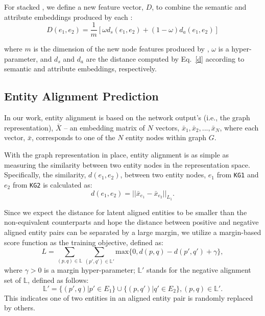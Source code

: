     For stacked \HRGCNs, we define a new feature vector, $D$, to combine the semantic and attribute embeddings produced by each \HRGCN:
	\begin{equation}
		D(e_1,e_2)=\frac{1}{m}[\omega d_s(e_1,e_2)+(1-\omega)d_a(e_1,e_2)]
	\end{equation}

	where $m$ is the dimension of the new node features produced by \HRGCNs, $\omega$ is a hyper-parameter, and $d_s$ and $d_a$ are the distance computed by Eq.~\ref{d} according to semantic and attribute embeddings, respectively.
	
	\subsection{Entity Alignment Prediction\label{prediction}}
   In our work, entity alignment is based on the network output's (i.e., the graph representation), $\bar{X}$ -- an embedding matrix of $N$ vectors, $\bar{x}_1,\bar{x}_2,...,\bar{x}_N$, where
   each vector, $\bar{x}$, corresponds to one
    of the $N$ entity nodes within graph $G$. 	


 With the graph representation in place, entity alignment is as simple as measuring the similarity between two entity
nodes in the representation space. Specifically, the similarity, $d(e_1,e_2)$, between two entity nodes, $e_1$ from \texttt{KG1} and $e_2$
from \texttt{KG2} is calculated as:
	\begin{equation}
	\label{d}
	d(e_1,e_2)=||\bar{x}_{e_1}-\bar{x}_{e_2}||_{L_1}.
	\end{equation}

	 Since we expect the distance for latent aligned entities to be smaller than the non-equivalent counterparts and hope the distance
between positive and negative aligned entity pairs can be separated by a large margin, we utilize a margin-based score function as the
training objective, defined as:
	\begin{equation}
	L=\sum\limits_{(p,q)\in \mathbb{L}}\sum\limits_{(p',q')\in \mathbb{L'}}\mathrm{max}\{0,d(p,q)-d(p',q')+\gamma\},
	\end{equation}
	where $\gamma > 0$ is a margin hyper-parameter; $\mathbb{L'}$ stands for the negative alignment set of $\mathbb{L}$, defined as follows:
	\begin{equation}
	\mathbb{L'}=\{(p',q)|p'\in E_1\}\cup\{(p,q')|q'\in E_2\}, (p,q)\in \mathbb{L'}.
	\end{equation}
	This indicates one of two entities in an aligned entity pair is randomly replaced by others.
	

	
	

	
	
